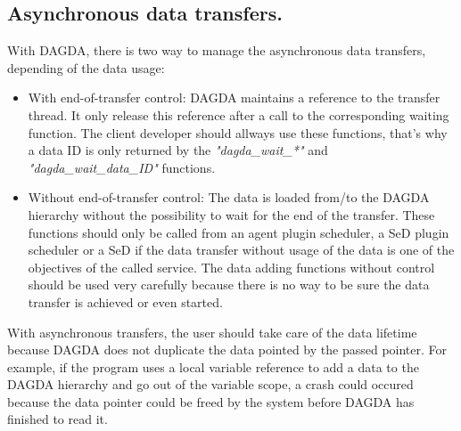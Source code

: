 \subsection{Asynchronous data transfers.}
With DAGDA, there is two way to manage the asynchronous data transfers,
depending of the data usage:
\begin{itemize}
  \item With end-of-transfer control: DAGDA maintains a reference to the
    transfer thread. It only release this reference after a call to the
    corresponding waiting function. The client developer should allways use
    these functions, that's why a data ID is only returned by the
    \textit{"dagda\_wait\_*"} and \textit{"dagda\_wait\_data\_ID"} functions.
  \item Without end-of-transfer control: The data is loaded from/to the
    DAGDA hierarchy without the possibility to wait for the end of the transfer.
    These functions should only be called from an agent plugin scheduler, a
    SeD plugin scheduler or a SeD if the data transfer without usage of the
    data is one of the objectives of the called service. The data adding
    functions without control should be used very carefully because there is
    no way to be sure the data transfer is achieved or even started.    
\end{itemize}
With asynchronous transfers, the user should take care of the data lifetime
because DAGDA does not duplicate the data pointed by the passed pointer.
For example, if the program uses a local variable reference to add a data
to the DAGDA hierarchy and go out of the variable scope, a crash could
occured because the data pointer could be freed by the system before DAGDA has
finished to read it.
